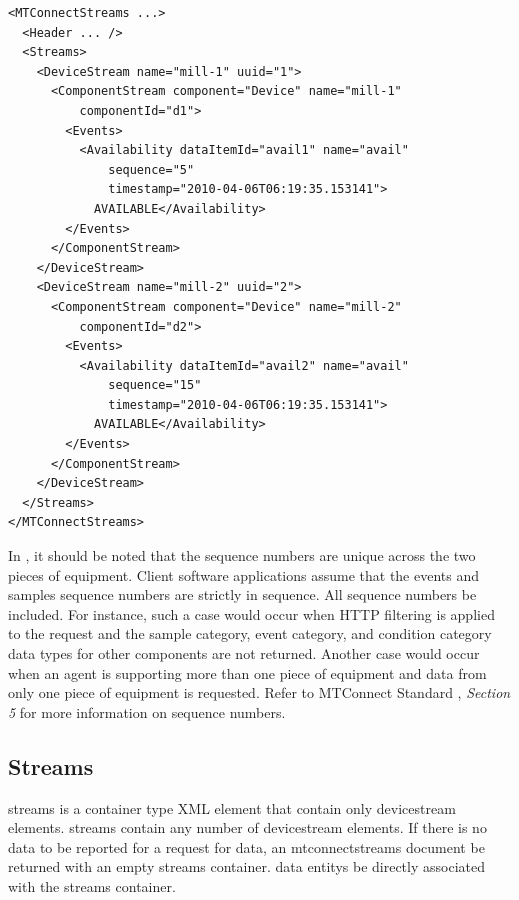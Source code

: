 \documentclass{mtconnect}	%
\begin{document}
\begin{lstlisting}[firstnumber=1,escapechar=|,%
    caption={Example of  DeviceStream},label={lst:example-of-devicestream}]
<MTConnectStreams ...>
  <Header ... />
  <Streams>
    <DeviceStream name="mill-1" uuid="1">
      <ComponentStream component="Device" name="mill-1"
          componentId="d1">
        <Events>
          <Availability dataItemId="avail1" name="avail"
              sequence="5"
              timestamp="2010-04-06T06:19:35.153141">
            AVAILABLE</Availability>
        </Events>
      </ComponentStream>
    </DeviceStream>
    <DeviceStream name="mill-2" uuid="2">
      <ComponentStream component="Device" name="mill-2"
          componentId="d2">
        <Events>
          <Availability dataItemId="avail2" name="avail" 
              sequence="15"
              timestamp="2010-04-06T06:19:35.153141">
            AVAILABLE</Availability>
        </Events>
      </ComponentStream>
    </DeviceStream>
  </Streams>
</MTConnectStreams>
\end{lstlisting}

In , it should be noted that the \glspl{sequence number} are unique across the two pieces of equipment. Client software applications \MUSTNOT assume that the \gls{events} and \gls{samples} sequence numbers are strictly in sequence. All sequence numbers \MAYNOT be included. For instance, such a case would occur when HTTP filtering is applied to the request and the \gls{sample category}, \gls{event category}, and \gls{condition category} data types for other components are not returned. Another case would occur when an \gls{agent} is supporting more than one piece of equipment and data from only one piece of equipment is requested. Refer to MTConnect Standard , \textit{Section 5} for more information on \glspl{sequence number}.


\subsection{Streams}

\gls{streams} is a container type XML element that \must contain only \gls{devicestream} elements.  \gls{streams} \may contain any number of \gls{devicestream} elements.  If there is no data to be reported for a request for data, an \gls{mtconnectstreams} document \must be returned with an empty \gls{streams} container.  \glspl{data entity} \maynot be directly associated with the \gls{streams} container.
\end{document}
